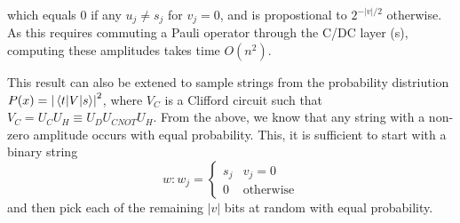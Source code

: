 which equals $0$ if any $u_{j}\neq s_{j}$ for $v_{j}=0$, and is propostional to $2^{-\left\vert v\right\vert/2}$ otherwise. As this requires commuting a Pauli operator through the C/DC layer (s), computing these amplitudes takes time $O(n^{2})$.\par
This result can also be extened to sample strings from the probability distriution $P(x)=\left\vert\matrixel{t}{V}{s}\right\vert^{2}$, where $V_{C}$ is a Clifford circuit such that $V_{C}=U_{C}U_{H}\equiv U_{D}U_{CNOT}U_{H}$. From the above, we know that any string with a non-zero amplitude occurs with equal probability. This, it is sufficient to start with a binary string
\[w:w_{j}=\begin{cases}s_{j} & v_{j}=0 \\ 0 & \text{otherwise}\end{cases}\]
and then pick each of the remaining $\left\vert v\right\vert$ bits at random with equal probability.

